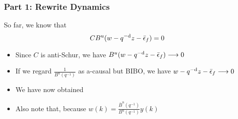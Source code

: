 \begin{frame}
    \frametitle{Part 1: Rewrite Dynamics}

    So far, we know that
    \begin{align*}
        CB^u (w - q^{-\textrm{d}} z - \bar{\epsilon}_f) = 0
    \end{align*}

    \begin{itemize}
        \item
        Since $C$ is anti-Schur, we have $B^u (w - q^{-\textrm{d}} z - \bar{\epsilon}_f) \longrightarrow 0$
        \pause

        \item
        If we regard $\displaystyle{\frac{1}{B^u(q^{-1})}}$ as a-causal but BIBO, we have $w - q^{-\textrm{d}} z - \bar{\epsilon}_f \longrightarrow 0$
        \pause

        \item
        We have now obtained
        \paused

        \item
        Also note that, because $\displaystyle{w(k) = \frac{\bar{B}^u(q^{-1})}{B^u(q^{-1})} y(k)}$
    \end{itemize}

\end{frame}

